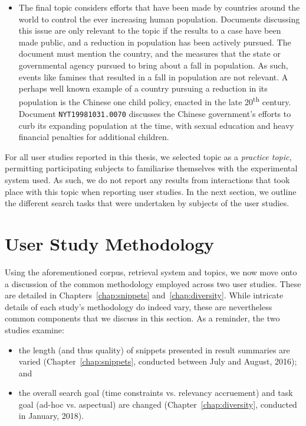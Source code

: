 \begin{itemize}
    \item{ The final topic considers efforts that have been made by countries around the world to control the ever increasing human population. Documents discussing this issue are only relevant to the topic if the results to a case have been made public, and a reduction in population has been actively pursued. The document must mention the country, and the measures that the state or governmental agency pursued to bring about a fall in population. As such, events like famines that resulted in a fall in population are not relevant. A perhaps well known example of a country pursuing a reduction in its population is the Chinese one child policy, enacted in the late 20\textsuperscript{th} century. Document \texttt{NYT19981031.0070} discusses the Chinese government's efforts to curb its expanding population at the time, with sexual education and heavy financial penalties for additional children.}
    
\end{itemize}

\vspace*{-3mm}
For all user studies reported in this thesis, we selected topic  as a \emph{practice topic,} permitting participating subjects to familiarise themselves with the experimental system used. As such, we do not report any results from interactions that took place with this topic when reporting user studies. In the next section, we outline the different search tasks that were undertaken by subjects of the user studies.

\section{User Study Methodology}\label{sec:methodology:user}
Using the aforementioned corpus, retrieval system and topics, we now move onto a discussion of the common methodology employed across two user studies. These are detailed in Chapters~\ref{chap:snippets} and~\ref{chap:diversity}. While intricate details of each study's methodology do indeed vary, these are nevertheless common components that we discuss in this section. As a reminder, the two studies examine:

\begin{itemize}
    \item{the length (and thus quality) of snippets presented in result summaries are varied (Chapter~\ref{chap:snippets}, conducted between July and August, 2016); and}

    \item{the overall search goal (time constraints vs. relevancy accruement) and task goal (ad-hoc vs. aspectual) are changed (Chapter~\ref{chap:diversity}, conducted in January, 2018).}
\end{itemize}
\vspace*{-4mm}

